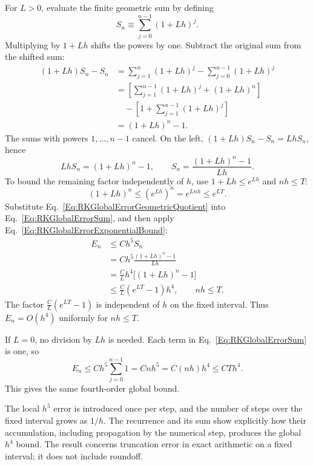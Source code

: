 For $L>0$, evaluate the finite geometric sum by defining
\[
 S_n\equiv\sum_{j=0}^{n-1}(1+Lh)^j.
\]
Multiplying by $1+Lh$ shifts the powers by one. Subtract the original
sum from the shifted sum:
\begin{equation}\label{Eq:RKGlobalErrorGeometricSum}
\begin{aligned}
 (1+Lh)S_n-S_n
 &=\sum_{j=1}^{n}(1+Lh)^j-\sum_{j=0}^{n-1}(1+Lh)^j\\
 &=\left[\sum_{j=1}^{n-1}(1+Lh)^j+(1+Lh)^n\right]\\
 &\quad-\left[1+\sum_{j=1}^{n-1}(1+Lh)^j\right]\\
 &=(1+Lh)^n-1.
\end{aligned}
\end{equation}
The sums with powers $1,\dots,n-1$ cancel. On the left,
$(1+Lh)S_n-S_n=LhS_n$, hence
\begin{equation}\label{Eq:RKGlobalErrorGeometricQuotient}
 LhS_n=(1+Lh)^n-1,
 \qquad S_n=\frac{(1+Lh)^n-1}{Lh}.
\end{equation}
To bound the remaining factor independently of $h$, use
$1+Lh\leq e^{Lh}$ and $nh\leq T$:
\begin{equation}\label{Eq:RKGlobalErrorExponentialBound}
 (1+Lh)^n\leq(e^{Lh})^n=e^{Lnh}\leq e^{LT}.
\end{equation}
Substitute Eq.~\ref{Eq:RKGlobalErrorGeometricQuotient} into
Eq.~\ref{Eq:RKGlobalErrorSum}, and then apply
Eq.~\ref{Eq:RKGlobalErrorExponentialBound}:
\begin{equation}\label{Eq:RKGlobalErrorBound}
\begin{aligned}
 E_n
 &\leq Ch^5S_n\\
 &=Ch^5\frac{(1+Lh)^n-1}{Lh}\\
 &=\frac{C}{L}h^4\bigl[(1+Lh)^n-1\bigr]\\
 &\leq\frac{C}{L}(e^{LT}-1)h^4,\qquad nh\leq T.
\end{aligned}
\end{equation}
The factor $\frac{C}{L}(e^{LT}-1)$ is independent of $h$ on the fixed
interval. Thus $E_n=O(h^4)$ uniformly for $nh\leq T$.

If $L=0$, no division by $Lh$ is needed. Each term in
Eq.~\ref{Eq:RKGlobalErrorSum} is one, so
\begin{equation}\label{Eq:RKGlobalErrorZeroGrowth}
 E_n\leq Ch^5\sum_{j=0}^{n-1}1
     =Cnh^5=C(nh)h^4\leq CTh^4.
\end{equation}
This gives the same fourth-order global bound.

The local $h^5$ error is introduced once per step, and the number of steps
over the fixed interval grows as $1/h$. The recurrence and its sum show
explicitly how their accumulation, including propagation by the numerical
step, produces the global $h^4$ bound. The result concerns truncation error
in exact arithmetic on a fixed interval; it does not include roundoff.

